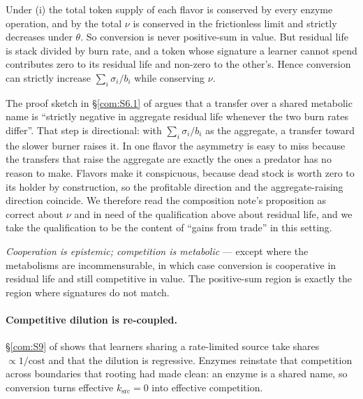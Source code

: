 \begin{proposition}\label{eng:prop:nomet2}
Under (i) the total token supply of each flavor is conserved by every
enzyme operation, and by \cite[Prop.~5.1]{vtok} the total $\nu$ is
conserved in the frictionless limit and strictly decreases under $\theta$.
So conversion is never positive-sum in value. But residual life is stack
divided by burn rate, and a token whose signature a learner cannot spend
contributes zero to its residual life and non-zero to the other's. Hence
conversion can strictly increase $\sum_i \sigma_i / b_i$ while conserving
$\nu$.
\end{proposition}

\begin{remark}\label{eng:honest-gap-source}
The proof sketch in \S\ref{com:S6.1} of \chComp argues that a transfer over a
shared metabolic name is ``strictly negative in aggregate residual life
whenever the two burn rates differ''. That step is directional: with
$\sum_i \sigma_i/b_i$ as the aggregate, a transfer toward the slower burner
raises it. In one flavor the asymmetry is easy to miss because the
transfers that raise the aggregate are exactly the ones a predator has no
reason to make. Flavors make it conspicuous, because dead stock is worth
zero to its holder by construction, so the profitable direction and the
aggregate-raising direction coincide. We therefore read the composition
note's proposition as correct about $\nu$ and in need of the qualification
above about residual life, and we take the qualification to be the content
of ``gains from trade'' in this setting.
\end{remark}

\begin{corollary}\label{eng:slogan-amended}
\emph{Cooperation is epistemic; competition is metabolic} --- except where
the metabolisms are incommensurable, in which case conversion is
cooperative in residual life and still competitive in value. The
positive-sum region is exactly the region where signatures do not match.
\end{corollary}

\paragraph{Competitive dilution is re-coupled.} \S\ref{com:S9} of \chComp shows
that learners sharing a rate-limited source take shares $\propto 1/\text{cost}$
and that the dilution is regressive. Enzymes reinstate that competition
across boundaries that rooting had made clean: an enzyme is a shared name,
so conversion turns effective $k_{\mathrm{src}} = 0$ into effective
competition.

